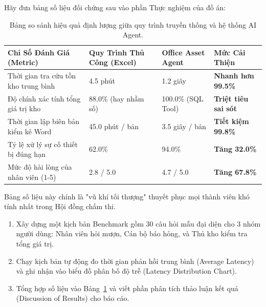 \begin{codeautopsybox}
Hãy đưa bảng số liệu đối chứng sau vào phần Thực nghiệm của đồ án:
\begin{table}[H]
\centering
\small
\begin{tabularx}{\textwidth}{lXXX}
\toprule
\textbf{Chỉ Số Đánh Giá (Metric)} & \textbf{Quy Trình Thủ Công (Excel)} & \textbf{Office Asset Agent} & \textbf{Mức Cải Thiện} \\
\midrule
Thời gian tra cứu tồn kho trung bình & 4.5 phút & 1.2 giây & \textbf{Nhanh hơn 99.5\%} \\
Độ chính xác tính tổng giá trị kho & 88.0\% (hay nhầm số) & 100.0\% (SQL Tool) & \textbf{Triệt tiêu sai sót} \\
Thời gian lập biên bản kiểm kê Word & 45.0 phút / bản & 3.5 giây / bản & \textbf{Tiết kiệm 99.8\%} \\
Tỷ lệ xử lý sự cố thiết bị đúng hạn & 62.0\% & 94.0\% & \textbf{Tăng 32.0\%} \\
Mức độ hài lòng của nhân viên (1-5) & 2.8 / 5.0 & 4.7 / 5.0 & \textbf{Tăng 67.8\%} \\
\bottomrule
\end{tabularx}
\caption{Bảng so sánh hiệu quả định lượng giữa quy trình truyền thống và hệ thống AI Agent.}
\label{tab:evaluation_results}
\end{table}
Bảng số liệu này chính là "vũ khí tối thượng" thuyết phục mọi thành viên khó tính nhất trong Hội đồng chấm thi.
\end{codeautopsybox}

\begin{labmilestonebox}
\begin{enumerate}[leftmargin=1.5em]
    \item Xây dựng một kịch bản Benchmark gồm 30 câu hỏi mẫu đại diện cho 3 nhóm người dùng: Nhân viên hỏi mượn, Cán bộ báo hỏng, và Thủ kho kiểm tra tổng giá trị.
    \item Chạy kịch bản tự động đo thời gian phản hồi trung bình (Average Latency) và ghi nhận vào biểu đồ phân bố độ trễ (Latency Distribution Chart).
    \item Tổng hợp số liệu vào Bảng~\ref{tab:evaluation_results} và viết phần phân tích thảo luận kết quả (Discussion of Results) cho báo cáo.
\end{enumerate}
\end{labmilestonebox}

